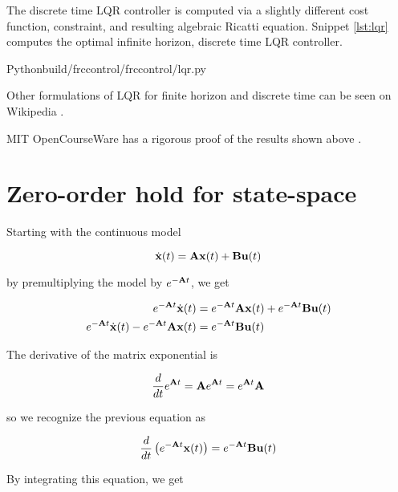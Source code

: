 The discrete time LQR \gls{controller} is computed via a slightly different cost
function, constraint, and resulting algebraic Ricatti equation. Snippet
\ref{lst:lqr} computes the optimal infinite horizon, discrete time LQR
\gls{controller}.

\begin{code}{Python}{build/frccontrol/frccontrol/lqr.py}
  \caption{Infinite horizon, discrete time LQR computation in Python}
  \label{lst:lqr}
\end{code}

Other formulations of LQR for finite horizon and discrete time can be seen on
Wikipedia \cite{bib:wiki_lqr}.

MIT OpenCourseWare has a rigorous proof of the results shown above
\cite{bib:lqr_derivs}.

\section{Zero-order hold for state-space}
\label{sec:deriv_zoh_ss}

Starting with the continuous \gls{model}

\begin{equation*}
  \dot{\mathbf{x}}(t) = \mathbf{A}\mathbf{x}(t) + \mathbf{B}\mathbf{u}(t)
\end{equation*}

by premultiplying the \gls{model} by $e^{-\mathbf{A}t}$, we get

\begin{align*}
  e^{-\mathbf{A}t}\dot{\mathbf{x}}(t) &= e^{-\mathbf{A}t}\mathbf{A}\mathbf{x}(t) +
    e^{-\mathbf{A}t}\mathbf{B}\mathbf{u}(t) \\
  e^{-\mathbf{A}t}\dot{\mathbf{x}}(t) - e^{-\mathbf{A}t}\mathbf{A}\mathbf{x}(t) &=
    e^{-\mathbf{A}t}\mathbf{B}\mathbf{u}(t)
\end{align*}

The derivative of the matrix exponential is

\begin{equation*}
  \frac{d}{dt}e^{\mathbf{A}t} = \mathbf{A}e^{\mathbf{A}t} = e^{\mathbf{A}t}\mathbf{A}
\end{equation*}

so we recognize the previous equation as

\begin{equation*}
  \frac{d}{dt}\left(e^{-\mathbf{A}t}\mathbf{x}(t)\right) =
    e^{-\mathbf{A}t}\mathbf{B}\mathbf{u}(t)
\end{equation*}

By integrating this equation, we get

